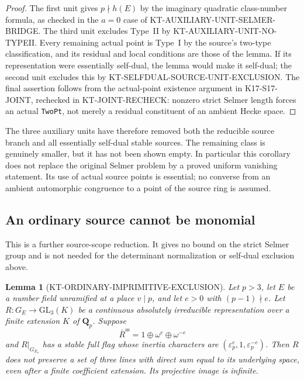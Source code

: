 \documentclass[11pt,a4paper]{article}
\newtheorem{lemma}[theorem]{Lemma}
\theoremstyle{definition}
\begin{document}
\begin{proof}
The first unit gives $p\nmid h(E)$ by the imaginary quadratic
class-number formula, as checked in the $a=0$ case of
KT-AUXILIARY-UNIT-SELMER-BRIDGE.
The third unit excludes Type~II by
KT-AUXILIARY-UNIT-NO-TYPEII.  Every remaining actual point
is Type~I by the source's two-type classification, and its
residual and local conditions are those of the lemma.
If its representation were essentially self-dual, the lemma
would make it self-dual; the second unit excludes this by
KT-SELFDUAL-SOURCE-UNIT-EXCLUSION.
The final assertion follows from the actual-point existence
argument in K17-S17-JOINT, rechecked in KT-JOINT-RECHECK:
nonzero strict Selmer length forces an actual \texttt{TwoPt},
not merely a residual constituent of an ambient Hecke space.
\end{proof}

The three auxiliary units have therefore removed both the
reducible source branch and all essentially self-dual stable
sources.  The remaining class is genuinely smaller, but it
has not been shown empty.  In particular this corollary does
not replace the original Selmer problem by a proved uniform
vanishing statement.  Its use of actual source points is
essential; no converse from an ambient automorphic congruence
to a point of the source ring is assumed.



\subsection{An ordinary source cannot be monomial}
\label{sec:kt-ordinary-imprimitive-exclusion}

This is a further source-scope reduction.  It gives no bound on
the strict Selmer group and is not needed for the determinant
normalization or self-dual exclusion above.

\begin{lemma}[KT-ORDINARY-IMPRIMITIVE-EXCLUSION]
Let $p>3$, let $E$ be a number field unramified at a place
$v\mid p$, and let $e>0$ with $(p-1)\nmid e$.
Let $R:G_E\to\mathrm{GL}_3(K)$ be a continuous absolutely
irreducible representation over a finite extension $K$ of
$\mathbf Q_p$.  Suppose
\[
              \bar R^{\mathrm{ss}}=1\oplus\omega^e
                                            \oplus\omega^{-e}
                                                               \tag{IM.1}
\]
and $R|_{G_{E_v}}$ has a stable full flag whose inertia
characters are $(\varepsilon_p^e,1,\varepsilon_p^{-e})$.
Then $R$ does not preserve a set of three lines with direct sum
equal to its underlying space, even after a finite coefficient
extension.  Its projective image is infinite.
\end{lemma}
\end{document}
